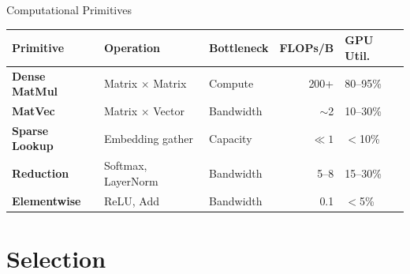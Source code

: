 \documentclass[aspectratio=169, 12pt]{beamer}
\begin{document}
\begin{frame}{Computational Primitives}
\scriptsize
\renewcommand{\arraystretch}{1.05}
\begin{tabular}{@{}lllrl@{}}
  \toprule
  \textbf{Primitive} & \textbf{Operation} & \textbf{Bottleneck} & \textbf{FLOPs/B} & \textbf{GPU Util.} \\
  \midrule
  \textbf{Dense MatMul} & Matrix $\times$ Matrix & Compute & 200+ & 80--95\% \\
  \textbf{MatVec} & Matrix $\times$ Vector & Bandwidth & $\sim$2 & 10--30\% \\
  \textbf{Sparse Lookup} & Embedding gather & Capacity & $\ll 1$ & $<$10\% \\
  \textbf{Reduction} & Softmax, LayerNorm & Bandwidth & 5--8 & 15--30\% \\
  \textbf{Elementwise} & ReLU, Add & Bandwidth & 0.1 & $<$5\% \\
  \bottomrule
\end{tabular}

\vspace{0.1cm}
\footnotesize
{}

\end{frame}

\section{Selection}
\end{document}
